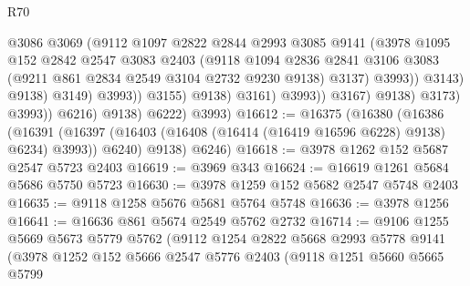 \begin{lexlean}{R70}
\begin{coremodule}
                                          @3086
                                          @3069
                                          (@9112
                                            @1097
                                            @2822
                                            @2844
                                            @2993
                                            @3085
                                            @9141
                                            (@3978
                                              @1095
                                              @152
                                              @2842
                                              @2547
                                              @3083
                                              @2403
                                              (@9118
                                                @1094
                                                @2836
                                                @2841
                                                @3106
                                                @3083
                                                (@9211 @861 @2834 @2549 @3104 @2732 @9230 @9138)
                                                @3137)
                                              @3993))
                                          @3143)
                                        @9138)
                                      @3149)
                                    @3993))
                                @3155)
                              @9138)
                            @3161)
                          @3993))
                      @3167)
                    @9138)
                  @3173)
                @3993))
            @6216)
          @9138)
        @6222)
      @3993)
@16612 := @16375
    (@16380
      (@16386
        (@16391 (@16397 (@16403 (@16408 (@16414 (@16419 @16596 @6228) @9138) @6234) @3993)) @6240)
        @9138)
      @6246)
@16618 := @3978 @1262 @152 @5687 @2547 @5723 @2403
@16619 := @3969 @343
@16624 := @16619 @1261 @5684 @5686 @5750 @5723
@16630 := @3978 @1259 @152 @5682 @2547 @5748 @2403
@16635 := @9118 @1258 @5676 @5681 @5764 @5748
@16636 := @3978 @1256
@16641 := @16636 @861 @5674 @2549 @5762 @2732
@16714 := @9106
    @1255
    @5669
    @5673
    @5779
    @5762
    (@9112
      @1254
      @2822
      @5668
      @2993
      @5778
      @9141
      (@3978
        @1252
        @152
        @5666
        @2547
        @5776
        @2403
        (@9118
          @1251
          @5660
          @5665
          @5799

\end{coremodule}
\end{lexlean}
